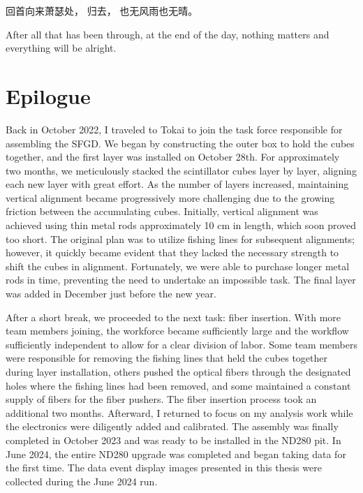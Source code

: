 \begin{savequote}[8cm]
\begin{CJK*}{UTF8}{gbsn}
回首向来萧瑟处，
归去，
也无风雨也无晴。
\end{CJK*}

After all that has been through, at the end of the day, nothing matters and everything will be alright.

\end{savequote}

\chapter{\label{ch:concl}Epilogue} 

\minitoc

Back in October 2022, I traveled to Tokai to join the task force responsible for assembling the SFGD.
We began by constructing the outer box to hold the cubes together, and the first layer was installed on October 28th.
For approximately two months, we meticulously stacked the scintillator cubes layer by layer, aligning each new layer with great effort.
As the number of layers increased, maintaining vertical alignment became progressively more challenging due to the growing friction between the accumulating cubes.
Initially, vertical alignment was achieved using thin metal rods approximately 10 cm in length, which soon proved too short.
The original plan was to utilize fishing lines for subsequent alignments; however, it quickly became evident that they lacked the necessary strength to shift the cubes in alignment.
Fortunately, we were able to purchase longer metal rods in time, preventing the need to undertake an impossible task.
The final layer was added in December just before the new year.

After a short break, we proceeded to the next task: fiber insertion.
With more team members joining, the workforce became sufficiently large and the workflow sufficiently independent to allow for a clear division of labor.
Some team members were responsible for removing the fishing lines that held the cubes together during layer installation, others pushed the optical fibers through the designated holes where the fishing lines had been removed, and some maintained a constant supply of fibers for the fiber pushers.
The fiber insertion process took an additional two months.
Afterward, I returned to focus on my analysis work while the electronics were diligently added and calibrated.
The assembly was finally completed in October 2023 and was ready to be installed in the ND280 pit.
In June 2024, the entire ND280 upgrade was completed and began taking data for the first time.
The data event display images presented in this thesis were collected during the June 2024 run.

